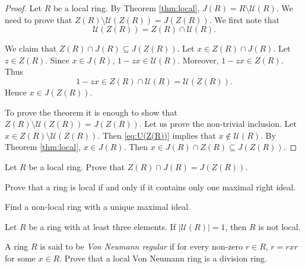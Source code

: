 \begin{proof}
    Let $R$ be a local ring. By Theorem \ref{thm:local}, $J(R)=R\setminus\mathcal{U}(R)$.  
    We need to prove that $Z(R)\setminus\mathcal{U}(Z(R))=J(Z(R))$. 
    We first note that
    \begin{equation}
    \label{eq:U(Z(R))}
        \mathcal{U}(Z(R))=Z(R)\cap\mathcal{U}(R).
    \end{equation}
    
    We claim that $Z(R)\cap J(R)\subseteq J(Z(R))$.  
    Let $x\in Z(R)\cap J(R)$. Let $z\in Z(R)$. Since $x\in J(R)$, $1-zx\in\mathcal{U}(R)$.
    Moreover, $1-zx\in Z(R)$. Thus 
    \[
    1-zx\in Z(R)\cap\mathcal{U}(R)=\mathcal{U}(Z(R)).
    \]
    Hence $x\in J(Z(R))$. 

    To prove the theorem it is enough to show that 
    $Z(R)\setminus\mathcal{U}(Z(R))=J(Z(R))$. Let us prove the non-trivial inclusion. 
    Let $x\in Z(R)\setminus\mathcal{U}(Z(R))$.  Then 
    \eqref{eq:U(Z(R))} implies that 
    $x\not\in\mathcal{U}(R)$. 
    By Theorem \ref{thm:local}, 
    $x\in J(R)$. Then $x\in J(R)\cap Z(R)\subseteq J(Z(R))$. 
\end{proof}

\begin{exercise}
\label{eq:local_center}
    Let $R$ be a local ring. Prove that 
    $Z(R)\cap J(R)=J(Z(R))$.  
\end{exercise}

\begin{exercise}
\label{xca:local_right}
    Prove that a ring is local if and only if it contains only one maximal right ideal.
\end{exercise}

\begin{exercise}
\label{xca:non_local1}
    Find a non-local ring with a unique maximal ideal. 
\end{exercise}


\begin{exercise}
\label{xca:non_local2}
    Let $R$ be a ring with at least three elements. 
    If $|\mathcal{U}(R)|=1$, then $R$ is not local. 
\end{exercise}


\begin{exercise}
\label{xca:VonNeumann_local}
    A ring $R$ is said to be \emph{Von Neumann regular} if  
    for every non-zero $r\in R$, $r=rxr$ for some $x\in R$. 
    Prove that a local Von Neumann ring is a division ring. 
\end{exercise}

